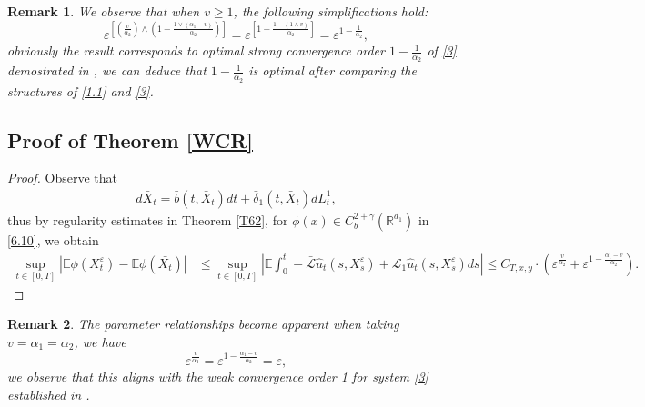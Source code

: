 \documentclass[11pt,reqno]{amsart}
\newtheorem{remark}{\indent Remark}[section]
\numberwithin{equation}{section}
\begin{document}


\begin{remark}\label{c7s}
We observe that when $v\geq1$, the following simplifications hold:
$$\varepsilon^{\left[ \left( \frac{v}{\alpha_{2}}\right) \wedge \left( 1-\frac{1\vee(\alpha_{1}-v)}{\alpha_{2}}\right) \right] }=\varepsilon^{\left[1-\frac{1-(1\wedge v)}{\alpha_{2}}\right]}=\varepsilon^{1-\frac{1}{\alpha_{2}}},$$
obviously the result corresponds to optimal strong convergence order $1-\frac{1}{\alpha_2}$ of \eqref{3} demostrated in \cite{SXX}, we can deduce that $1-\frac{1}{\alpha_{2}}$ is optimal after comparing the structures of \eqref{1.1} and \eqref{3}.
\end{remark}





\subsection{Proof of \textbf{Theorem \ref{WCR}}}
\begin{proof}
Observe that 
\begin{align*}
	d\bar{X}_{t}=\bar{b}(t,\bar{X}_{t})dt+\bar{\delta}_{1}(t,\bar{X}_{t})dL_{t}^{1},
\end{align*}
thus by regularity estimates in   Theorem \ref{T62}, for $\phi(x)\in C^{2+\gamma}_{b}(\mathbb{R}^{d_{1}})$ in \eqref{6.10}, we obtain
\begin{align*}
	\sup_{t\in [0,T]}|\mathbb{E}\phi(X_{t}^{\varepsilon})-\mathbb{E}\phi(\bar{X_{t}})|
	&\leq\sup_{t\in [0,T]}\left|\mathbb{E}  \int_{0}^{t}-\mathcal{\bar{L}}\hat{u}_{t}(s,X_{s}^{\varepsilon})+\mathcal{L}_{1}\hat{u}_{t}(s,X_{s}^{\varepsilon})ds \right|\leq C_{T,x,y}\cdot \left(\varepsilon^{\frac{v}{\alpha_{2}}}+\varepsilon^{1-\frac{\alpha_{1}-v}{\alpha_{2}}}\right).
\end{align*}
\end{proof}


\begin{remark}\label{c7w}
The parameter relationships become apparent when taking $v=\alpha_{1}=\alpha_{2}$, we have
$$\varepsilon^{\frac{v}{\alpha_{2}}}=\varepsilon^{1-\frac{\alpha_{1}-v}{\alpha_{2}}}=\varepsilon,$$
we observe that this aligns with the weak convergence order 1 for system \eqref{3} established in \cite{SXX}.
\end{remark}
\end{document}
